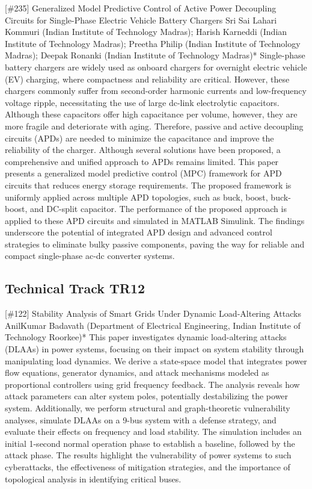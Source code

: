 {} \begin{abstract_online} {[\#235] Generalized Model Predictive Control of Active Power Decoupling Circuits for Single-Phase Electric Vehicle Battery Chargers} {} {Sri Sai Lahari Kommuri  (Indian Institute of Technology Madras); Harish Karneddi (Indian Institute of Technology Madras); Preetha Philip (Indian Institute of Technology Madras); Deepak  Ronanki (Indian Institute of Technology Madras)*} {} Single-phase battery chargers are widely used as onboard chargers for overnight electric vehicle (EV) charging, where compactness and reliability are critical. However, these chargers commonly suffer from second-order harmonic currents and low-frequency voltage ripple, necessitating the use of large dc-link electrolytic capacitors. Although these capacitors offer high capacitance per volume, however, they are more fragile and deteriorate with aging. Therefore, passive and active decoupling circuits (APDs) are needed to minimize the capacitance and improve the reliability of the charger. Although several solutions have been proposed, a comprehensive and unified approach to APDs remains limited. This paper presents a generalized model predictive control (MPC) framework for APD circuits that reduces energy storage requirements. The proposed framework is uniformly applied across multiple APD topologies, such as buck, boost, buck-boost, and DC-split capacitor. The performance of the proposed approach is applied to these APD circuits and simulated in MATLAB Simulink. The findings underscore the potential of integrated APD design and advanced control strategies to eliminate bulky passive components, paving the way for reliable and compact single-phase ac-dc converter systems.  \end{abstract_online} 
\clearpage \subsection{Technical Track TR12}\nopagebreak {} \begin{abstract_online} {[\#122] Stability Analysis of Smart Grids Under Dynamic Load-Altering Attacks} {} {AnilKumar Badavath (Department of Electrical Engineering, Indian Institute of Technology Roorkee)*} {} This paper investigates dynamic load-altering attacks (DLAAs) in power systems, focusing on their impact on system stability through manipulating load dynamics. We derive a state-space model that integrates power flow equations, generator dynamics, and attack mechanisms modeled as proportional controllers using grid frequency feedback. The analysis reveals how attack parameters can alter system poles, potentially destabilizing the power system. Additionally, we perform structural and graph-theoretic vulnerability analyses, simulate DLAAs on a 9-bus system with a defense strategy, and evaluate their effects on frequency and load stability. The simulation includes an initial 1-second normal operation phase to establish a baseline, followed by the attack phase. The results highlight the vulnerability of power systems to such cyberattacks, the effectiveness of mitigation strategies, and the importance of topological analysis in identifying critical buses. \end{abstract_online} 
